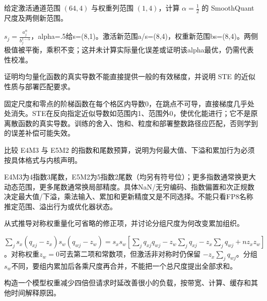 \begin{exercises}
\begin{exercise} 给定激活通道范围 $(64,4)$ 与权重列范围 $(1,4)$，计算 $\alpha=\frac{1}{2}$ 的 SmoothQuant 尺度及两侧新范围。

\begin{solution}
$s_j=\frac{a_j^{\alpha}}{b_j^{1-\alpha}}$，alpha=.5给s=(8,1)。激活新范围a/s=(8,4)，权重新范围bs=(8,4)。两侧极值被平衡，乘积不变；这并未计算实际量化误差或证明该alpha最优，仍需代表性校准。
\end{solution}
\end{exercise}

\begin{exercise} 证明均匀量化函数的真实导数不能直接提供一般的有效梯度，并说明 STE 的近似性质与部署匹配要求。

\begin{solution}
固定尺度和零点的阶梯函数在每个格区内导数0，在跳点不可导，直接梯度几乎处处消失。STE在反向指定近似导数如范围内1、范围外0，使优化能进行；它不是原离散函数的真实导数。训练的舍入、饱和、粒度和部署整数路径应匹配，否则学到的误差补偿可能失效。
\end{solution}
\end{exercise}

\begin{exercise}\optional 比较 E4M3 与 E5M2 的指数和尾数预算，说明为何最大值、下溢和累加行为必须按具体格式与内核声明。

\begin{solution}
E4M3为4指数3尾数，E5M2为5指数2尾数（均另有符号位）；更多指数通常换更大动态范围，更多尾数通常换局部精度。具体NaN/无穷编码、指数偏置和次正规数决定最大值/下溢，乘法输入、累加和更新精度又是不同选择。不能只看FP8名称推定范围、溢出行为或优化器状态。
\end{solution}
\end{exercise}

\begin{exercise} 从式推导对称权重量化可省略的修正项，并讨论分组尺度为何改变累加组织。

\begin{solution}
$\sum_j s_x(q_{xj}-z_x)s_w(q_{wj}-z_w)=s_xs_w[\sum_jq_{xj}q_{wj}-z_w\sum_jq_{xj}-z_x\sum_jq_{wj}+nz_xz_w]$。对称权重$z_w=0$可去第二项和常数项，但激活非对称时仍保留 $-z_x\sum_jq_{wj}$。分组$s_w$不同，要组内累加后各乘尺度再合并，不能把一个总尺度提出全部求和。
\end{solution}
\end{exercise}

\begin{exercise} 构造一个模型权重减少四倍但请求时延改善很小的负载，按带宽、计算、缓存和其他时间解释原因。


\end{exercise}
\end{exercises}
